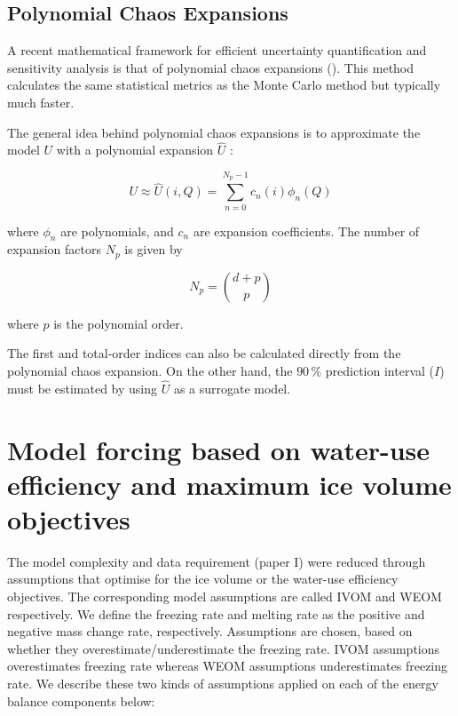 \subsection{Polynomial Chaos Expansions}

A recent mathematical framework for efficient uncertainty quantification and sensitivity analysis is that of
polynomial chaos expansions (\cite{xiuHighOrderCollocationMethods2005}). This method calculates the same statistical metrics as the Monte
Carlo method but typically much faster.

The general idea behind polynomial chaos expansions is to approximate the model $U$ with a polynomial expansion
$\hat{U}$ : 

\begin{equation} U \approx \hat{U}(i, Q) = \sum_{n=0}^{N_p-1} c_n(i) \phi_n(Q) \end{equation}

where $\phi_n$ are polynomials, and $c_n$ are expansion coefficients. The number of expansion factors $N_p$ is
given by

\begin{equation}
  N_p = \binom{d+p}{p}
\end{equation}

where $p$ is the polynomial order. 

The first and total-order indices can also be calculated directly from the polynomial chaos expansion. On the
other hand, the $90\, \%$ prediction interval ($I$) must be estimated by using $\hat{U}$ as a surrogate
model.

\section{Model forcing based on water-use efficiency and maximum ice volume objectives}
\label{sec:auto_software}

The model complexity and data requirement (paper I) were reduced through assumptions that optimise for the ice
volume or the water-use efficiency objectives. The corresponding model assumptions are called IVOM and WEOM
respectively. We define the freezing rate and melting rate as the positive and negative mass change rate,
respectively. Assumptions are chosen, based on whether they overestimate/underestimate the freezing rate. IVOM
assumptions overestimates freezing rate whereas WEOM assumptions underestimates freezing rate. We describe these
two kinds of assumptions applied on each of the energy balance components below: 

